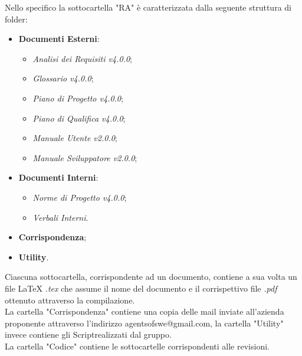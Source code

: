 	Nello specifico la sottocartella "RA" è caratterizzata dalla seguente struttura di folder:
	\begin{itemize}
		\item \textbf{Documenti Esterni}:
		\begin{itemize}
			\item \textit{Analisi dei Requisiti v4.0.0};
			\item \textit{Glossario v4.0.0};
			\item \textit{Piano di Progetto v4.0.0};
			\item \textit{Piano di Qualifica v4.0.0};
			\item \textit{Manuale Utente v2.0.0};
			\item \textit{Manuale Sviluppatore v2.0.0};
		\end{itemize}
		\item \textbf{Documenti Interni}:
		\begin{itemize}
			\item \textit{Norme di Progetto v4.0.0};
			\item \textit{Verbali Interni}.
		\end{itemize}
		\item \textbf{Corrispondenza};
		\item \textbf{Utility}.
	\end{itemize}
	Ciascuna sottocartella, corrispondente ad un documento, contiene a sua volta un file LaTeX \textit{.tex} che assume il nome del documento e il corrispettivo file \textit{.pdf} ottenuto attraverso la compilazione.\\
	La cartella "Corrispondenza" contiene una copia delle mail inviate all'azienda proponente attraverso l'indirizzo agentsofswe@gmail.com, la cartella "Utility" invece contiene gli Script\glossario realizzati dal gruppo.\\
	La cartella "Codice" contiene le sottocartelle corrispondenti alle revisioni.


